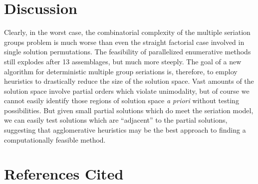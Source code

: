 \documentclass[preprint,times,authoryear,12pt]{els-workingpaper}
\begin{document}




\section{Discussion}
\label{sec:conclusions}

Clearly, in the worst case, the combinatorial complexity of the multiple seriation groups problem is much worse than even the straight factorial case involved in single solution permutations.  The feasibility of parallelized enumerative methods still explodes after 13 assemblages, but much more steeply.  The goal of a new algorithm for deterministic multiple group seriations is, therefore, to employ heuristics to drastically reduce the size of the solution space.  Vast amounts of the solution space involve partial orders which violate unimodality, but of course we cannot easily identify those regions of solution space \emph{a priori} without testing possibilities.  But given small partial solutions which do meet the seriation model, we can easily test solutions which are ``adjacent'' to the partial solutions, suggesting that agglomerative heuristics may be the best approach to finding a computationally feasible method.  





\section*{References Cited}



\end{document}
